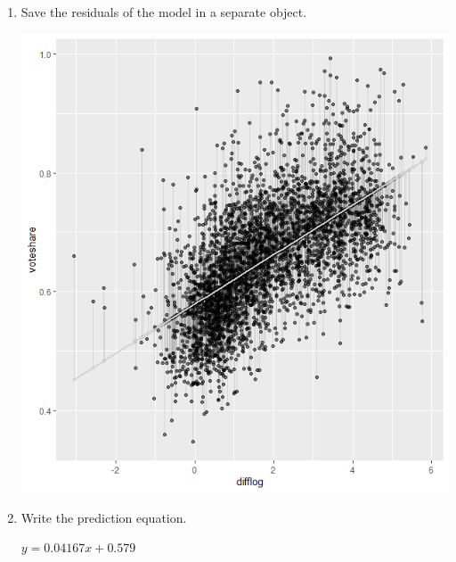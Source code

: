 \documentclass[12pt,letterpaper]{article}
\begin{document}
\begin{enumerate}
		\item Save the residuals of the model in a separate object.
		
			\includegraphics{Q1P2.png}
			\vspace{2cm}
		\item Write the prediction equation.
		
		$y=0.04167x+0.579$
	\end{enumerate}
	
\newpage
\end{document}
